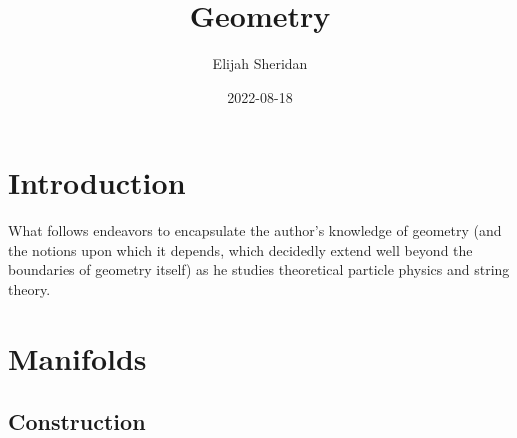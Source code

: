 \documentclass[
]{book}
\title{Geometry}
\author{Elijah Sheridan}
\date{2022-08-18}
\begin{document}
\maketitle

{
\setcounter{tocdepth}{1}
\tableofcontents
}
\hypertarget{introduction}{%
\chapter*{Introduction}\label{introduction}}

What follows endeavors to encapsulate the author's knowledge of geometry (and the notions upon which it depends, which decidedly extend well beyond the boundaries of geometry itself) as he studies theoretical particle physics and string theory.

\hypertarget{manifolds}{%
\chapter{Manifolds}\label{manifolds}}

\hypertarget{construction}{%
\section{Construction}\label{construction}}
\end{document}
